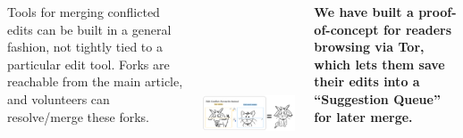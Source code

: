 \documentclass[25pt, a0paper, landscape, cmyk]{tikzposter}
\begin{document}
\begin{columns}
{    \vspace{0.5cm}
  \begin{minipage}{\mw}
    Tools for merging conflicted edits can be built in a general
    fashion, not tightly tied to a particular edit tool.
    Forks are reachable from the main article, and volunteers can
    resolve/merge these forks.
  \end{minipage}\hfill\begin{minipage}{\myfigwidth}
    \includegraphics[height=6.5cm]{favourite-animal.png}
  \end{minipage}
    \vspace{0.75cm}

    \textbf{We have built a proof-of-concept
    for readers browsing via Tor, which lets them save their
    edits into a ``Suggestion Queue'' for later merge.}

}
\end{columns}
\end{document}
